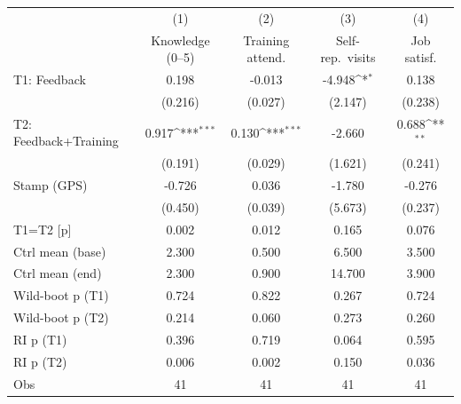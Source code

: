 {
\def\sym#1{\ifmmode^{#1}\else\(^{#1}\)\fi}
\begin{tabular}{l*{4}{c}}
\toprule
                    &\multicolumn{1}{c}{(1)}&\multicolumn{1}{c}{(2)}&\multicolumn{1}{c}{(3)}&\multicolumn{1}{c}{(4)}\\
                    &\multicolumn{1}{c}{Knowledge (0--5)}&\multicolumn{1}{c}{Training attend.}&\multicolumn{1}{c}{Self-rep.\ visits}&\multicolumn{1}{c}{Job satisf.}\\
\midrule
T1: Feedback        &       0.198         &      -0.013         &      -4.948\sym{*}  &       0.138         \\
                    &     (0.216)         &     (0.027)         &     (2.147)         &     (0.238)         \\
T2: Feedback+Training&       0.917\sym{***}&       0.130\sym{***}&      -2.660         &       0.688\sym{**} \\
                    &     (0.191)         &     (0.029)         &     (1.621)         &     (0.241)         \\
Stamp (GPS)         &      -0.726         &       0.036         &      -1.780         &      -0.276         \\
                    &     (0.450)         &     (0.039)         &     (5.673)         &     (0.237)         \\
\midrule
T1=T2 [p]           &       0.002         &       0.012         &       0.165         &       0.076         \\
Ctrl mean (base)    &       2.300         &       0.500         &       6.500         &       3.500         \\
Ctrl mean (end)     &       2.300         &       0.900         &      14.700         &       3.900         \\
Wild-boot p (T1)    &       0.724         &       0.822         &       0.267         &       0.724         \\
Wild-boot p (T2)    &       0.214         &       0.060         &       0.273         &       0.260         \\
RI p (T1)           &       0.396         &       0.719         &       0.064         &       0.595         \\
RI p (T2)           &       0.006         &       0.002         &       0.150         &       0.036         \\
Obs                 &          41         &          41         &          41         &          41         \\
\bottomrule
\end{tabular}
}
